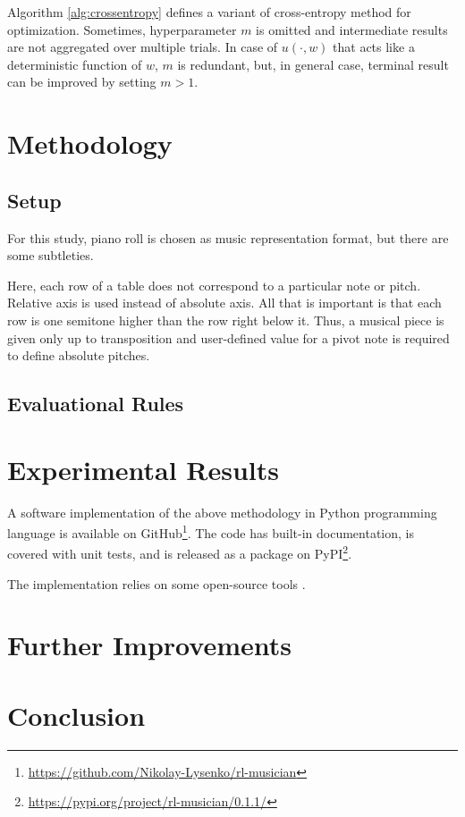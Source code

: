 \documentclass{article}
\begin{document}
Algorithm \ref{alg:crossentropy} defines a variant of cross-entropy method for optimization. Sometimes, hyperparameter $m$ is omitted and intermediate results are not aggregated over multiple trials. In case of $u(\cdot, w)$ that acts like a deterministic function of $w$, $m$ is redundant, but, in general case, terminal result can be improved by setting $m > 1$.


\section{Methodology}
\label{sec:methodology}

\subsection{Setup}
\label{subsec:setup}

For this study, piano roll is chosen as music representation format, but there are some subtleties.

Here, each row of a table does not correspond to a particular note or pitch. Relative axis is used instead of absolute axis. All that is important is that each row is one semitone higher than the row right below it. Thus, a musical piece is given only up to transposition and user-defined value for a pivot note is required to define absolute pitches.

\subsection{Evaluational Rules}
\label{subsec:setup}


\section{Experimental Results}
\label{sec:results}

A software implementation of the above methodology in Python programming language is available on GitHub\footnote{\url{https://github.com/Nikolay-Lysenko/rl-musician}}. The code has built-in documentation, is covered with unit tests, and is released as a package on PyPI\footnote{\url{https://pypi.org/project/rl-musician/0.1.1/}}.

The implementation relies on some open-source tools \cite{brockman2016openai,chollet2015keras,oliphant2006guide,raffel2014intuitive,dong2018pypianoroll}.


\section{Further Improvements}
\label{sec:improvements}


\section{Conclusion}
\label{sec:conclusion}


  

\end{document}
